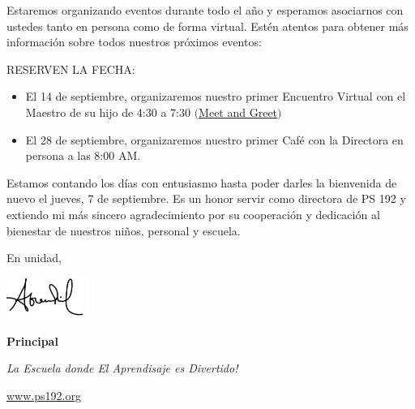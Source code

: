 \documentclass[12pt,letterpaper]{article}
\begin{document}
Estaremos organizando eventos durante todo el año y esperamos asociarnos con ustedes tanto en persona como de forma virtual. Estén atentos para obtener más información sobre todos
nuestros próximos eventos:
\pagebreak
\vspace*{2cm}

RESERVEN LA FECHA:
	\begin{itemize}
	\item El 14 de septiembre, organizaremos nuestro primer Encuentro Virtual con el
	Maestro de su hijo de 4:30 a 7:30 $($\href{https://www.ps192.org/apps/pages/index.jsp?uREC_ID=1504975&type=d&pREC_ID=2510452&tota11y=true}{Meet and Greet}$)$
	\item El 28 de septiembre, organizaremos nuestro primer Café con la Directora en
	persona a las 8:00 AM.
	\end{itemize}
 
Estamos contando los días con entusiasmo hasta poder darles la bienvenida de nuevo el 
jueves, 7 de septiembre. Es un honor servir como directora de PS 192 y extiendo mi más
sincero agradecimiento por su cooperación y dedicación al bienestar de nuestros niños,
personal y escuela.

En unidad,

\includegraphics[width=0.2\textwidth]{hil_signature}

\textbf{Principal}

\textit{La Escuela donde El Aprendisaje es Divertido!}

\url{www.ps192.org}
\end{document}
